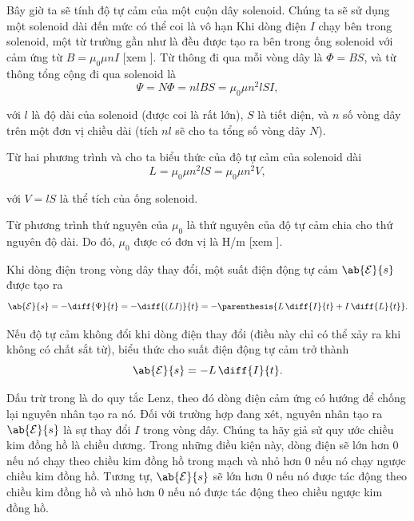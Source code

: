 Bây giờ ta sẽ tính độ tự cảm của một cuộn dây solenoid.
Chúng ta sẽ sử dụng một solenoid dài đến mức có thể coi là vô hạn
Khi dòng điện $I$ chạy bên trong solenoid, một từ trường gần như là đều được tạo ra bên trong ống solenoid với cảm ứng từ $B=\mu_0\mu nI$ [xem ].
Từ thông đi qua mỗi vòng dây là $\Phi=BS$, và từ thông tổng cộng đi qua solenoid là
\begin{equation}\label{eq:8_13}
	\Psi = N\Phi = nlBS = \mu_0 \mu n^2 l S I,
\end{equation}

\noindent
với $l$ là độ dài của solenoid (được coi là rất lớn), $S$ là tiết diện, và $n$ số vòng dây trên một đơn vị chiều dài (tích $nl$ sẽ cho ta tổng số vòng dây $N$).

Từ hai phương trình  và  cho ta biểu thức của độ tự cảm của solenoid dài
\begin{equation}\label{eq:8_14}
	L = \mu_0 \mu n^2 l S = \mu_0 \mu n^2 V,
\end{equation}

\noindent
với $V = lS$ là thể tích của ống solenoid.

Từ phương trình  thứ nguyên của $\mu_0$ là thứ nguyên của độ tự cảm chia cho thứ nguyên độ dài.
Do đó, $\mu_0$ được có đơn vị là H/m [xem ].

Khi dòng điện trong vòng dây thay đổi, một suất điện động tự cảm $\ab{\mathcal{E}}{s}$ được tạo ra
\begin{equation}\label{eq:8_15}
	\ab{\mathcal{E}}{s} = - \diff{\Psi}{t} = - \diff{(LI)}{t} = - \parenthesis{L\, \diff{I}{t} + I\, \diff{L}{t}}.
\end{equation}

\noindent
Nếu độ tự cảm không đổi khi dòng điện thay đổi (điều này chỉ có thể xảy ra khi không có chất sắt từ), biểu thức cho suất điện động tự cảm trở thành
\begin{equation}\label{eq:8_16}
	\ab{\mathcal{E}}{s} = - L\, \diff{I}{t}.
\end{equation}

\noindent
Dấu trừ trong  là do quy tắc Lenz, theo đó dòng điện cảm ứng có hướng để chống lại nguyên nhân tạo ra nó.
Đối với trường hợp đang xét, nguyên nhân tạo ra $\ab{\mathcal{E}}{s}$ là sự thay đổi $I$ trong vòng dây.
Chúng ta hãy giả sử quy ước chiều kim đồng hồ là chiều dương.
Trong những điều kiện này, dòng điện sẽ lớn hơn 0 nếu nó chạy theo chiều kim đồng hồ trong mạch và nhỏ hơn 0 nếu nó chạy ngược chiều kim đồng hồ.
Tương tự, $\ab{\mathcal{E}}{s}$ sẽ lớn hơn
0 nếu nó được tác động theo chiều kim đồng hồ và nhỏ hơn 0 nếu nó được tác động theo chiều ngược kim đồng hồ.

